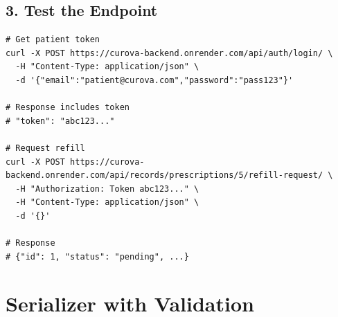 \documentclass[11pt,a4paper,twoside]{report}
\begin{document}
\subsection{3. Test the Endpoint}

\begin{lstlisting}
# Get patient token
curl -X POST https://curova-backend.onrender.com/api/auth/login/ \
  -H "Content-Type: application/json" \
  -d '{"email":"patient@curova.com","password":"pass123"}'

# Response includes token
# "token": "abc123..."

# Request refill
curl -X POST https://curova-backend.onrender.com/api/records/prescriptions/5/refill-request/ \
  -H "Authorization: Token abc123..." \
  -H "Content-Type: application/json" \
  -d '{}'

# Response
# {"id": 1, "status": "pending", ...}
\end{lstlisting}

\section{Serializer with Validation}
\end{document}
